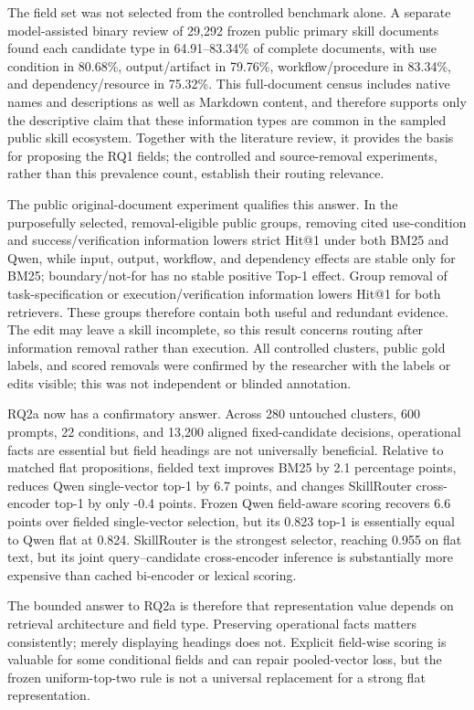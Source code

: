 The field set was not selected from the controlled benchmark alone. A separate model-assisted binary review of 29,292 frozen public primary skill documents found each candidate type in 64.91--83.34\% of complete documents, with use condition in 80.68\%, output/artifact in 79.76\%, workflow/procedure in 83.34\%, and dependency/resource in 75.32\%. This full-document census includes native names and descriptions as well as Markdown content, and therefore supports only the descriptive claim that these information types are common in the sampled public skill ecosystem. Together with the literature review, it provides the basis for proposing the RQ1 fields; the controlled and source-removal experiments, rather than this prevalence count, establish their routing relevance.

The public original-document experiment qualifies this answer. In the purposefully selected, removal-eligible public groups, removing cited use-condition and success/verification information lowers strict Hit@1 under both BM25 and Qwen, while input, output, workflow, and dependency effects are stable only for BM25; boundary/not-for has no stable positive Top-1 effect. Group removal of task-specification or execution/verification information lowers Hit@1 for both retrievers. These groups therefore contain both useful and redundant evidence. The edit may leave a skill incomplete, so this result concerns routing after information removal rather than execution. All controlled clusters, public gold labels, and scored removals were confirmed by the researcher with the labels or edits visible; this was not independent or blinded annotation.

RQ2a now has a confirmatory answer. Across 280 untouched clusters, 600 prompts, 22 conditions, and 13,200 aligned fixed-candidate decisions, operational facts are essential but field headings are not universally beneficial. Relative to matched flat propositions, fielded text improves BM25 by 2.1 percentage points, reduces Qwen single-vector top-1 by 6.7 points, and changes SkillRouter cross-encoder top-1 by only -0.4 points. Frozen Qwen field-aware scoring recovers 6.6 points over fielded single-vector selection, but its 0.823 top-1 is essentially equal to Qwen flat at 0.824. SkillRouter is the strongest selector, reaching 0.955 on flat text, but its joint query--candidate cross-encoder inference is substantially more expensive than cached bi-encoder or lexical scoring.

The bounded answer to RQ2a is therefore that representation value depends on retrieval architecture and field type. Preserving operational facts matters consistently; merely displaying headings does not. Explicit field-wise scoring is valuable for some conditional fields and can repair pooled-vector loss, but the frozen uniform-top-two rule is not a universal replacement for a strong flat representation.


